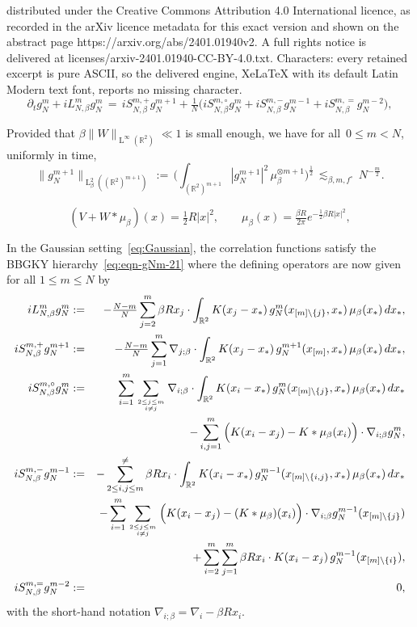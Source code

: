 \documentclass[10pt,a4paper]{amsart}
\newcommand{\Ld}{\operatorname{L}}
\newcommand{\R}{\mathbb R}
\begin{document}
distributed under the Creative Commons Attribution 4.0 International licence, as recorded in the arXiv licence metadata for this exact version and shown on the abstract page https://arxiv.org/abs/2401.01940v2. A full rights notice is delivered at licenses/arxiv-2401.01940-CC-BY-4.0.txt. Characters: every retained excerpt is pure ASCII, so the delivered engine, XeLaTeX with its default Latin Modern text font, reports no missing character.
\begin{equation}\label{eq:eqn-gNm-21}
\partial_t g_N^m+iL_{N,\beta}^mg_N^m
\,=\,iS_{N,\beta}^{m,+}g_N^{m+1}+\tfrac1N\Big(iS_{N,\beta}^{m,\circ}g_N^{m}+iS_{N,\beta}^{m,-}g_N^{m-1}+iS_{N,\beta}^{m,=}g_N^{m-2}\Big),
\end{equation}

\begin{lem}\label{lem:est-cum-2}
Provided that $\beta\|W\|_{\Ld^\infty(\R^2)}\ll1$ is small enough, we have for all~$0\le m<N$, uniformly in time,
\[\|g_N^{m+1}\|_{\Ld^2_\beta((\R^2)^{m+1})}\,:=\,\Big(\int_{(\R^2)^{m+1}}|g_N^{m+1}|^2\,\mu_\beta^{\otimes m+1}\Big)^\frac12\,\lesssim_{\beta,m,f^\circ}\,N^{-\frac m2}.\]
\end{lem}

\begin{equation}\label{eq:Gaussian}
(V+W\ast\mu_\beta)(x)=\tfrac12R|x|^2,\qquad\mu_\beta(x)=\tfrac{\beta R}{2\pi}e^{-\frac12\beta R|x|^2},
\end{equation}

\begin{lem}\label{lem:eqn-gNm-21-G}
In the Gaussian setting~\eqref{eq:Gaussian},
the correlation functions satisfy the BBGKY hierarchy~\eqref{eq:eqn-gNm-21}
where the defining operators are now given for all $1\le m\le N$ by
\begingroup\allowdisplaybreaks
\begin{eqnarray*}
iL_{N,\beta}^mg_N^m&:=&-\tfrac{N-m}N\sum_{j=2}^m\beta Rx_j\cdot\int_{\R^2} K(x_j-x_*)\,g_N^{m}(x_{[m]\setminus\{j\}},x_*)\,\mu_\beta(x_*)\,dx_*,\\
iS_{N,\beta}^{m,+}g_N^{m+1}&:=&-\tfrac{N-m}N\sum_{j=1}^m\nabla_{j;\beta}\cdot \int_{\R^2} K(x_j-x_*)\,g_N^{m+1}(x_{[m]},x_*)\,\mu_\beta(x_*)\,dx_*,\\
iS_{N,\beta}^{m,\circ}g_N^{m}&:=&\sum_{i=1}^m\sum_{2\le j\le m\atop i\ne j}\nabla_{i;\beta}\cdot\int_{\R^2}K(x_i-x_*)\,g_N^{m}(x_{[m]\setminus\{j\}},x_*)\,\mu_\beta(x_*)\,dx_*\\
&&-\sum_{i,j=1}^m\Big(K(x_i-x_j)-K\ast\mu_\beta(x_i)\Big)\cdot\nabla_{i;\beta}g_N^m,\\
iS_{N,\beta}^{m,-}g_N^{m-1}&:=&-\sum_{2\le i,j\le m}^{\ne}\beta Rx_i\cdot\int_{\R^2} K(x_i-x_*)\,g_N^{m-1}(x_{[m]\setminus\{i,j\}},x_*)\,\mu_\beta(x_*)\,dx_*\\
&&-\sum_{i=1}^m\sum_{2\le j\le m\atop i\ne j}\Big(K(x_i-x_j)-(K\ast\mu_\beta)(x_i)\Big)\cdot\nabla_{i;\beta}g_N^{m-1}(x_{[m]\setminus\{j\}})\\
&&+\sum_{i=2}^m\sum_{j=1}^m\beta Rx_i\cdot K(x_i-x_j)\,g_N^{m-1}(x_{[m]\setminus\{i\}}),\\
iS_{N,\beta}^{m,=}g_N^{m-2}&:=&0,
\end{eqnarray*}
\endgroup
with the short-hand notation $\nabla_{i;\beta}=\nabla_i-\beta Rx_i$.
\end{lem}
\end{document}
